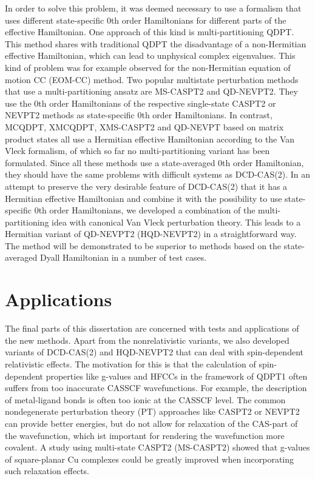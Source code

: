 In order to solve this problem, it was deemed necessary to use a formalism that uses different state-specific 0th order Hamiltonians for different parts of the effective Hamiltonian. One approach of this kind is multi-partitioning QDPT.\cite{ZaitsM_1995_597} This method shares with traditional QDPT the disadvantage of a non-Hermitian effective Hamiltonian, which can lead to unphysical complex eigenvalues. This kind of problem was for example observed for the non-Hermitian equation of motion CC (EOM-CC) method.\cite{KoehnT_2007_44105} Two popular multistate perturbation methods that use a multi-partitioning ansatz are MS-CASPT2\cite{FinleMRS_1998_299} and QD-NEVPT2.\cite{AngelBCC_2004_4043} They use the 0th order Hamiltonians of the respective single-state CASPT2 or NEVPT2 methods as state-specific 0th order Hamiltonians. In contrast, MCQDPT,\cite{Nakan_1993_7983} XMCQDPT,\cite{Grano_2011_214113} XMS-CASPT2\cite{ShiozGCW_2011_81106} and QD-NEVPT based on matrix product states\cite{SharmJA_2016_34103} all use a Hermitian effective Hamiltonian according to the Van Vleck formalism, of which so far no multi-partitioning variant has been formulated. Since all these methods use a state-averaged 0th order Hamiltonian, they should have the same problems with difficult systems as DCD-CAS(2).
In an attempt to preserve the very desirable feature of DCD-CAS(2) that it has a Hermitian effective Hamiltonian and combine it with the possibility to use state-specific 0th order Hamiltonians, we developed a combination of the multi-partitioning idea with canonical Van Vleck perturbation theory. This leads to a Hermitian variant of QD-NEVPT2 (HQD-NEVPT2) in a straightforward way. The method will be demonstrated to be superior to methods based on the state-averaged Dyall Hamiltonian\cite{Dyall_1995_4909} in a number of test cases.

\section{Applications}
The final parts of this dissertation are concerned with tests and applications of the new methods. Apart from the nonrelativistic variants, we also developed variants of DCD-CAS(2) and HQD-NEVPT2 that can deal with spin-dependent relativistic effects. The motivation for this is that the calculation of spin-dependent properties like g-values and HFCCs in the framework of QDPT1 often suffers from too inaccurate CASSCF wavefunctions. For example, the description of metal-ligand bonds is often too ionic at the CASSCF level.\cite{VancoMP_2007_1803} The common nondegenerate perturbation theory (PT) approaches like CASPT2\cite{AnderMRSW_1990_5483, AnderMR_1992_1218} or NEVPT2\cite{AngelCELM_2001_10252, AngelCM_2001_297} can provide better energies, but do not allow for relaxation of the CAS-part of the wavefunction, which ist important for rendering the wavefunction more covalent. A study using multi-state CASPT2 (MS-CASPT2)\cite{FinleMRS_1998_299} showed that g-values of square-planar Cu complexes could be greatly improved when incorporating such relaxation effects.\cite{VancoP_2008_4011}

